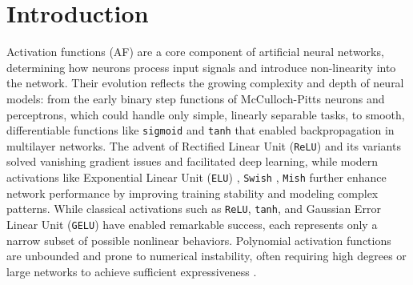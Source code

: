 \documentclass[manuscript, screen, review]{jair}
\begin{document}





\maketitle

\section{Introduction}
Activation functions (AF) are a core component of artificial neural networks, determining how neurons process input 
signals and introduce non-linearity into the network. Their evolution reflects the growing complexity 
and depth of neural models: from the early binary step functions of McCulloch-Pitts \cite{mcculloch1943logical}
neurons and perceptrons, 
which could handle only simple, linearly separable tasks, to smooth, differentiable functions like \texttt{sigmoid} \cite{MINAI1993845}
and \texttt{tanh} \cite{6795724} that enabled backpropagation in multilayer networks. The advent of Rectified Linear Unit (\texttt{ReLU}) \cite{relu} and its variants solved 
vanishing gradient issues and facilitated deep learning, while modern activations like Exponential Linear Unit (\texttt{ELU}) \cite{clevert2016fastaccuratedeepnetwork}, 
\texttt{Swish} \cite{ramachandran2017searchingactivationfunctions}, 
\texttt{Mish} \cite{misra2020mishselfregularizednonmonotonic} 
further enhance network performance by improving training stability and modeling complex patterns.
While classical activations such as \texttt{ReLU}, \texttt{tanh}, and Gaussian Error Linear Unit (\texttt{GELU}) \cite{hendrycks2023gaussianerrorlinearunits}
have enabled remarkable success, each represents only a narrow subset of possible nonlinear behaviors. 
Polynomial activation functions are unbounded and prone to numerical instability, 
often requiring high degrees or large networks to achieve sufficient expressiveness \cite{Hornik1989Multilayer}
\cite{Leshno1993NonPolynomial} \cite{Goodfellow2016DeepLearning}.
\end{document}
